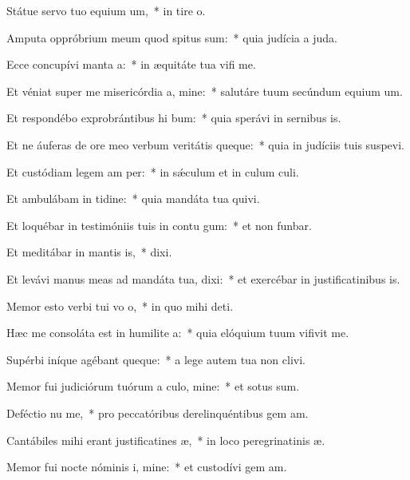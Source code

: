 \item Státue servo tuo equium um,~* in tire o.
\item Amputa oppróbrium meum quod spitus sum:~* quia judícia a juda.
\item Ecce concupívi manta a:~* in æquitáte tua vifi me.
\item Et véniat super me misericórdia a, mine:~* salutáre tuum secúndum equium um.
\item Et respondébo exprobrántibus hi bum:~* quia sperávi in sernibus is.
\item Et ne áuferas de ore meo verbum veritátis queque:~* quia in judíciis tuis suspevi.
\item Et custódiam legem am per:~* in sǽculum et in culum culi.
\item Et ambulábam in tidine:~* quia mandáta tua quivi.
\item Et loquébar in testimóniis tuis in contu gum:~* et non funbar.
\item Et meditábar in mantis is,~*  dixi.
\item Et levávi manus meas ad mandáta tua,  dixi:~* et exercébar in justificatinibus is.
\item Memor esto verbi tui vo o,~* in quo mihi  deti.
\item Hæc me consoláta est in humilite a:~* quia elóquium tuum vifivit me.
\item Supérbi iníque agébant queque:~* a lege autem tua non clivi.
\item Memor fui judiciórum tuórum a culo, mine:~* et sotus sum.
\item Deféctio nu me,~* pro peccatóribus derelinquéntibus gem am.
\item Cantábiles mihi erant justificatines æ,~* in loco peregrinatinis æ.
\item Memor fui nocte nóminis i, mine:~* et custodívi gem am.

